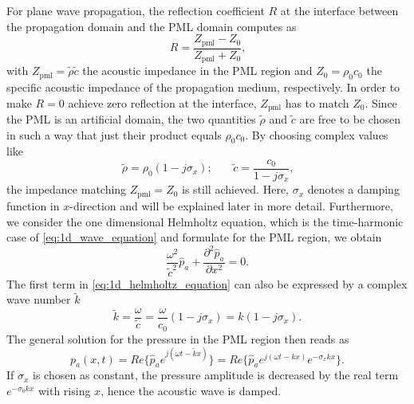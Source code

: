 For plane wave propagation, the reflection coefficient $R$ at the interface between the propagation domain and the PML domain computes as
\begin{equation}
	R = \frac{Z_{\text{pml}} - Z_{\text{0}}}{Z_{\text{pml}} + Z_{\text{0}}}\text{,} \label{eq:reflection_coefficient_PML}
\end{equation}
with $Z_{\text{pml}} = \tilde{\rho}\tilde{c}$ the acoustic impedance in the PML region and $Z_{\text{0}} = \rho_0 c_0$ the specific acoustic impedance of the propagation medium, respectively. In order to make $R = 0$ achieve zero reflection at the interface, $Z_{\text{pml}}$ has to match $Z_{\text{0}}$. Since the PML is an artificial domain, the two quantities $\tilde{\rho}$ and $\tilde{c}$ are free to be chosen in such a way that just their product equals $\rho_0 c_0$. By choosing complex values like
\begin{equation}
	\tilde{\rho} = \rho_0(1 - j\sigma_x)\text{;}\qquad \tilde{c} = \frac{c_0}{1- j\sigma_x}\text{,}
\end{equation}
the impedance matching $Z_{\text{pml}} = Z_{\text{0}}$ is still achieved. Here, $\sigma_x$ denotes a damping function in $x$-direction and will be explained later in more detail. Furthermore, we consider the one dimensional Helmholtz equation, which is the time-harmonic case of \cref{eq:1d_wave_equation} and formulate for the PML region, we obtain
\begin{equation}
	\frac{\omega^2}{\tilde{c}^2}\hat{p}_a  +
	\frac{\partial^2 \hat{p}_a}{\partial x^2} = 0 \text{.} \label{eq:1d_helmholtz_equation}
\end{equation}
The first term in \cref{eq:1d_helmholtz_equation} can also be expressed by a complex wave number $\tilde{k}$
\begin{equation}
	\tilde{k} = \frac{\omega}{\tilde{c}} = \frac{\omega}{c_0}(1- j\sigma_x) = k(1-j\sigma_x)\text{.}
\end{equation}
The general solution for the pressure in the PML region then reads as
\begin{equation}
	p_a(x,t) = Re\lbrace\hat{p}_a e^{j(\omega t - \tilde{k}x)}\rbrace = Re\lbrace\hat{p}_a e^{j(\omega t - kx)} e^{-\sigma_x kx}\rbrace \text{.} \label{eq:noname_3}
\end{equation}
If $\sigma_x$ is chosen as constant, the pressure amplitude is decreased by the real term $e^{-\sigma_0 kx}$ with rising $x$, hence the acoustic wave is damped.


